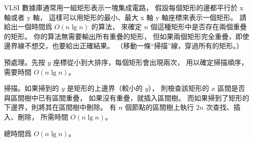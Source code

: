 \startEXERCISE\DIFFICULT
VLSI 數據庫通常用一組矩形表示一塊集成電路，
假設每個矩形的邊都平行於 x 軸或者 y 軸，
這樣可以用矩形的最小、最大 x 軸 y 軸座標來表示一個矩形。
請給出一個時間爲 $O(n\lg n)$ 的算法，
來確定 $n$ 個這種矩形中是否存在兩個重疊的矩形。
你的算法無需要輸出所有重疊的矩形，
但如果兩個矩形完全重疊，即使邊界線不想交，也要給出正確結果。
（\hint 移動一條“掃描”線，穿過所有的矩形。）
\stopEXERCISE

\startANSWER
預處理。先按 $y$ 座標從小到大排序，每個矩形會出現兩次，
用以確定掃描順序，需要時間 $O(n\lg n)$。

掃描。如果掃到的 $y$ 是矩形的上邊界（較小的 $y$），
則檢查該矩形的 $x$ 區間是否與區間樹中已有區間重疊，
如果沒有重疊，就插入區間樹。
而如果掃到了矩形的下邊界，則將其在區間樹中刪除。
有 $n$ 個節點的區間樹上執行 $2n$ 次查找、插入、刪除，
所需時間 $O(n\lg n)$。

總時間爲 $O(n\lg n)$。
\stopANSWER
